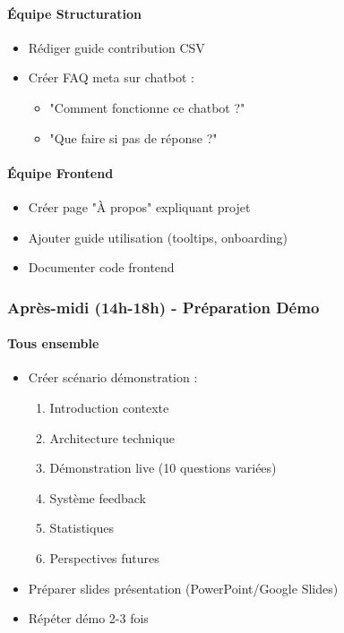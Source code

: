 \documentclass[11pt,a4paper]{article}
\begin{document}
\paragraph{Équipe Structuration}
\begin{itemize}
    \item[$\square$] Rédiger guide contribution CSV
    \item[$\square$] Créer FAQ meta sur chatbot :
    \begin{itemize}
        \item "Comment fonctionne ce chatbot ?"
        \item "Que faire si pas de réponse ?"
    \end{itemize}
\end{itemize}

\paragraph{Équipe Frontend}
\begin{itemize}
    \item[$\square$] Créer page "À propos" expliquant projet
    \item[$\square$] Ajouter guide utilisation (tooltips, onboarding)
    \item[$\square$] Documenter code frontend
\end{itemize}

\subsubsection{Après-midi (14h-18h) - Préparation Démo}

\paragraph{Tous ensemble}
\begin{itemize}
    \item[$\square$] Créer scénario démonstration :
    \begin{enumerate}
        \item Introduction contexte
        \item Architecture technique
        \item Démonstration live (10 questions variées)
        \item Système feedback
        \item Statistiques
        \item Perspectives futures
    \end{enumerate}
    \item[$\square$] Préparer slides présentation (PowerPoint/Google Slides)
    \item[$\square$] Répéter démo 2-3 fois
\end{itemize}
\end{document}
